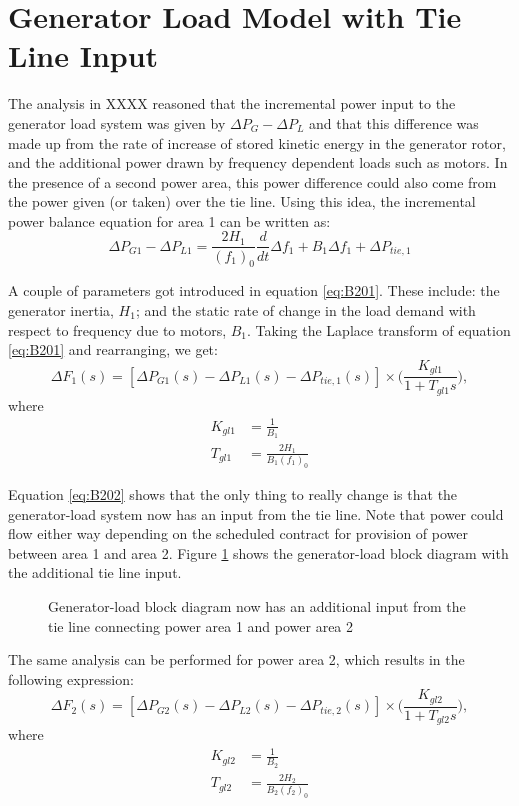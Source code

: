 \section{Generator Load Model with Tie Line Input}
The analysis in XXXX reasoned that the incremental power input to the generator load system was given by $\Delta P_G - \Delta P_L$ and that this difference was made up from the rate of increase of stored kinetic energy in the generator rotor, and the additional power drawn by frequency dependent loads such as motors. In the presence of a second power area, this power difference could also come from the power given (or taken) over the tie line. Using this idea, the incremental power balance equation for area 1 can be written as:
\begin{equation}
	\Delta P_{G1} - \Delta P_{L1} = \frac{2 H_1}{(f_1)_0} \frac{d}{dt} \Delta f_1 + B_1 \Delta f_1 + \Delta P_{tie, 1} \label{eq:B201}
\end{equation}

A couple of parameters got introduced in equation \ref{eq:B201}. These include: the generator inertia, $H_1$; and the static rate of change in the load demand with respect to frequency due to motors, $B_1$. Taking the Laplace transform of equation \ref{eq:B201} and rearranging, we get:
\begin{equation}
	\Delta F_1(s) = [\Delta P_{G1}(s) - \Delta P_{L1}(s) - \Delta P_{tie,1}(s)] \times \bigg( \frac{K_{gl1}}{1 + T_{gl1}s} \bigg), \label{eq:B202}
\end{equation}
where
\begin{align}
	K_{gl1} &= \frac{1}{B_1} \\
	T_{gl1} &= \frac{2H_1}{B_1 (f_1)_0}
\end{align}

Equation \ref{eq:B202} shows that the only thing to really change is that the generator-load system now has an input from the tie line. Note that power could flow either way depending on the scheduled contract for provision of power between area 1 and area 2. Figure \ref{fig:B201_generator_load_model_1_with_tie_line} shows the generator-load block diagram with the additional tie line input.

\begin{figure}[h]
	\centering
	
	\caption{Generator-load block diagram now has an additional input from the tie line connecting power area 1 and power area 2}
	\label{fig:B201_generator_load_model_1_with_tie_line}
\end{figure}

The same analysis can be performed for power area 2, which results in the following expression:
\begin{equation}
	\Delta F_2(s) = [\Delta P_{G2}(s) - \Delta P_{L2}(s) - \Delta P_{tie,2}(s)] \times \bigg( \frac{K_{gl2}}{1 + T_{gl2}s} \bigg), \label{eq:B203}
\end{equation}
where
\begin{align}
	K_{gl2} &= \frac{1}{B_2} \\
	T_{gl2} &= \frac{2H_2}{B_2 (f_2)_0}
\end{align}